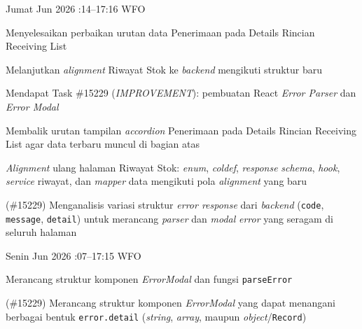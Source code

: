 \begin{logtable}
    {
        Jumat  Jun 2026 :14--17:16 \linebreak %
        WFO
    }{
        \begin{loglist}
            \item Menyelesaikan perbaikan urutan data Penerimaan pada Details Rincian Receiving
            List
            \item Melanjutkan \textit{alignment} Riwayat Stok ke \textit{backend} mengikuti
            struktur baru
            \item Mendapat Task \#15229 (\textit{IMPROVEMENT}): pembuatan React \textit{Error
                Parser} dan \textit{Error Modal}
        \end{loglist}
    }{
        \begin{logwork}
            \item Membalik urutan tampilan \textit{accordion} Penerimaan pada Details Rincian
            Receiving List agar data terbaru muncul di bagian atas
            \item \textit{Alignment} ulang halaman Riwayat Stok: \textit{enum}, \textit{coldef}, \textit{response} \textit{schema}, \textit{hook}, \textit{service} riwayat, dan \textit{mapper} data mengikuti pola \textit{alignment} yang baru
            \item (\#15229) Menganalisis variasi struktur \textit{error response} dari \textit{backend} (\texttt{code}, \texttt{message}, \texttt{detail}) untuk merancang \textit{parser} dan \textit{modal} \textit{error} yang seragam di seluruh halaman
        \end{logwork}
    }


    {
        Senin  Jun 2026 :07--17:15 \linebreak %
        WFO
    }{
        \begin{loglist}
            \item Merancang struktur komponen \textit{ErrorModal} dan fungsi \texttt{parseError}
        \end{loglist}
    }{
        \begin{logwork}
            \item (\#15229) Merancang struktur komponen \textit{ErrorModal} yang dapat menangani berbagai bentuk \texttt{error.detail} (\textit{string}, \textit{array}, maupun \textit{object}/\texttt{Record})
        \end{logwork}
    }


\end{logtable}
